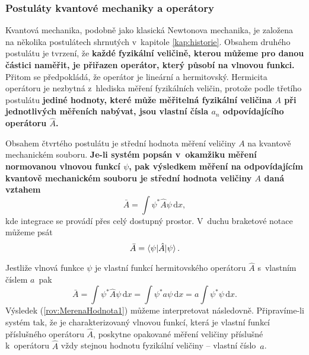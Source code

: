 \subsubsection{Postuláty kvantové mechaniky a operátory}
\label{kap:PostulatyKvantoveMechaniky}

Kvantová mechanika, podobně jako klasická Newtonova mechanika, je založena na několika postulátech shrnutých v~kapitole \ref{kap:historie}. Obsahem druhého postulátu je tvrzení, že \textbf{každé fyzikální veličině, kterou můžeme pro danou částici naměřit, je přiřazen operátor, který působí na vlnovou funkci.} Přitom se předpokládá, že operátor je lineární a hermitovský. Hermicita operátoru je nezbytná z~hlediska měření fyzikálních veličin, protože podle třetího postulátu \textbf{jediné hodnoty, které může měřitelná fyzikální veličina $A$ při jednotlivých měřeních nabývat, jsou vlastní čísla $a_n$ odpovídajícího operátoru $\hat{A}$.}

Obsahem čtvrtého postulátu je střední hodnota měření veličiny $A$ na kvantově mechanickém souboru. \textbf{Je-li systém popsán v~okamžiku měření normovanou vlnovou funkcí $\psi$, pak výsledkem měření na odpovídajícím kvantově mechanickém souboru je střední hodnota veličiny $A$ daná vztahem}
\begin{equation}
\boxed{\bar{A} = \int \psi^\ast \hat{A} \psi \,\mathrm{d}x,}
\label{rov:StředniHodnotaVeliciny}
\end{equation}
kde integrace se provádí přes celý dostupný prostor. V~duchu braketové notace můžeme psát
\begin{equation}
\bar{A} = \braket{\psi|\hat{A}|\psi} \mbox{.}
\nonumber
\end{equation}

Jestliže vlnová funkce $\psi$ je vlastní funkcí hermitovského operátoru $\hat{A}$ s~vlastním číslem $a$~pak
\begin{equation}
\bar{A} = \int \psi^{\ast} \hat{A} \psi \,\mathrm{d}x = \int \psi^{\ast} a \psi \,\mathrm{d}x = a \int \psi^{\ast} \psi \,\mathrm{d}x.
\label{rov:MerenaHodnota1}
\end{equation}
Výsledek (\ref{rov:MerenaHodnota1}) můžeme interpretovat následovně. Připravíme-li systém tak, že je charakterizovaný vlnovou funkcí, která je vlastní funkcí příslušného operátoru $\hat{A}$, poskytne opakované měření veličiny příslušné k~operátoru $\hat{A}$ vždy stejnou hodnotu fyzikální veličiny -- vlastní číslo~$a$.

